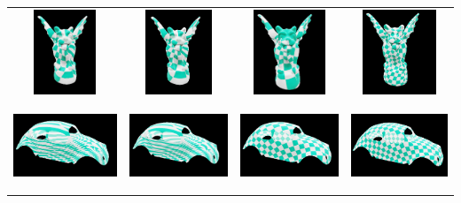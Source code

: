 \documentclass[12pt]{article}
\begin{document}
\begin{table}[htb]
\begin{center}
\begin{tabular}{|c|c|c|c|}
\includegraphics[height=1in]{33.png}&\includegraphics[height=1in]{34.png}&\includegraphics[height=1in]{35.png}&\includegraphics[height=1in]{36.png}\\
\includegraphics[height=1in]{43.png}&\includegraphics[height=1in]{44.png}&\includegraphics[height=1in]{45.png}&\includegraphics[height=1in]{46.png}\\\hline

\end{tabular}
\end{center}
\end{table}
\end{document}
